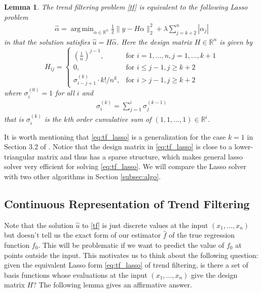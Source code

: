 \documentclass[a4paper]{article}
\DeclareMathOperator*{\argmin}{arg\,min}
\newtheorem{lemma}[theorem]{Lemma}
\newcommand{\RR}{\mathbb{R}}
\begin{document}
\begin{lemma}
The trend filtering problem \eqref{tf} is equivalent to the following Lasso problem
\begin{align}
\hat{\alpha} = \argmin_{\alpha\in\RR^n}\frac{1}{2}\|y-H\alpha\|_2^2 + \lambda\sum_{j=k+2}^n |\alpha_j|
\label{eq:tf_lasso}
\end{align}
in that the solution satisfies $\hat{u} = H\hat{\alpha}$. Here the design matrix $H\in\RR^n$ is given by
\begin{equation}
H_{ij} = 
\begin{cases}
(\frac{i}{n})^{j-1}, & \text{for } i = 1,\ldots, n, j=1,\ldots, k+1\\
0, & \text{for } i \leq j-1, j\geq k+2\\
\sigma_{i-j+1}^{(k)} \cdot k!/n^k, &\text{for } i > j-1, j\geq k+2
\end{cases}
\label{eq:H_cumsum}
\end{equation}
where $\sigma_i^{(0)} = 1$ for all $i$ and
\begin{align*}
\sigma^{(k)}_i = \sum_{j=1}^i \sigma_j^{(k-1)}
\end{align*}
that is $\sigma_i^{(k)}$ is the $k$th order cumulative sum of $(1,1,\ldots, 1)\in\RR^i$.
\end{lemma}
It is worth mentioning that \eqref{eq:tf_lasso} is a generalization for the case $k =1$ in Section 3.2 of \cite{kim2009ell_1}. Notice that the design matrix in \eqref{eq:tf_lasso} is close to a lower-triangular matrix and thus has a sparse structure, which makes general lasso solver very efficient for solving \eqref{eq:tf_lasso}. We will compare the Lasso solver with two other algorithms in Section \ref{subsec:algo}. 

\subsection{Continuous Representation of Trend Filtering}
\label{subsec:ct_tf}
Note that the solution $\hat{u}$ to \eqref{tf} is just discrete values at the input $(x_1,\ldots, x_n)$ but doesn't tell us the exact form of our estimator $\hat{f}$ of the true regression function $f_0$. This will be problematic if we want to predict the value of $f_0$ at points outside the input. This motivates us to think about the following question: given the equivalent Lasso form \eqref{eq:tf_lasso} of trend filtering, is there a set of basis functions whose evaluations at the input $(x_1,\ldots, x_n)$ give the design matrix $H$? The following lemma gives an affirmative answer.
\end{document}
